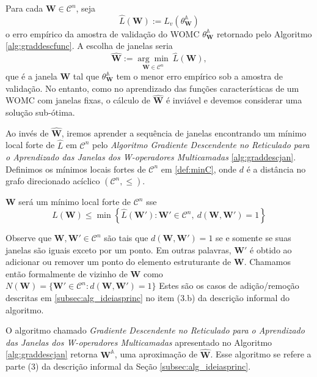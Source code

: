 Para cada $\textbf{W} \in \mathscr{C}^{n} $, seja
$$ \hat{L} \left( \textbf{W} \right) := L_{v} \left( \theta_{\textbf{W}}^{\mathbb{A}} \right)$$
o erro empírico da amostra de validação do WOMC $\theta_{\textbf{W}}^{\mathbb{A}}$ retornado pelo Algoritmo \ref{alg:graddescfunc}. A escolha de janelas seria
$$\hat{\textbf{W}} := \underset{\textbf{W} \in \mathscr{C}^{n}}{\arg \min } \ \hat{L} \left( \textbf{W} \right), $$
que é a janela $\textbf{W}$ tal que $\theta_{\textbf{W}}^{\mathbb{A}}$ tem o menor erro empírico sob a amostra de validação. No entanto, como no aprendizado das funções características de um WOMC com janelas fixas, o cálculo de $\hat{\textbf{W}} $ é inviável e devemos considerar uma solução sub-ótima.

Ao invés de $\hat{\textbf{W}} $, iremos aprender a sequência de janelas encontrando um mínimo local forte de $\hat{L}$ em $\mathscr{C}^{n}$ pelo \textit{Algoritmo Gradiente Descendente no Reticulado para o Aprendizado das Janelas dos W-operadores Multicamadas} \ref{alg:graddescjan}. Definimos os mínimos locais fortes de $\mathscr{C}^{n}$ em \ref{def:minC}, onde $d$ é a distância no grafo direcionado acíclico $\left( \mathscr{C}^{n}, \leq \right) $.

\begin{definition}
    $\textbf{W}$ será um mínimo local forte de $\mathscr{C}^{n}$ sse
    $$\hat{L} \left( \textbf{W} \right) \leq \min \left\{ \hat{L} \left( \textbf{W} ' \right): \textbf{W} ' \in \mathscr{C}^{n}, \ d \left( \textbf{W} ,\textbf{W}' \right) = 1 \right\} $$
    \label{def:minC}
\end{definition}

Observe que $\textbf{W} ,\textbf{W}' \in \mathscr{C}^{n} $ são tais que $d \left(\textbf{W} ,\textbf{W}' \right) = 1$ se e somente se suas janelas são iguais exceto por um ponto. Em outras palavras, $\textbf{W}'$ é obtido ao adicionar ou remover um ponto do elemento estruturante de $\textbf{W}$. Chamamos então formalmente de vizinho de $\textbf{W}$ como $N \left( \textbf{W} \right) = \{ \textbf{W}'  \in \mathscr{C}^{n}: d \left( \textbf{W} ,\textbf{W}' \right) = 1 \}$ Estes são os casos de adição/remoção descritas em \ref{subsec:alg_ideiasprinc} no item (3.b) da descrição informal do algoritmo.

O algoritmo chamado \textit{Gradiente Descendente no Reticulado para o Aprendizado das Janelas dos W-operadores Multicamadas}  apresentado no Algoritmo \ref{alg:graddescjan} retorna $\textbf{W}^{\mathbb{A}}$, uma aproximação de $\hat{\textbf{W}}$. Esse algoritmo se refere a parte (3) da descrição informal da Seção \ref{subsec:alg_ideiasprinc}.

